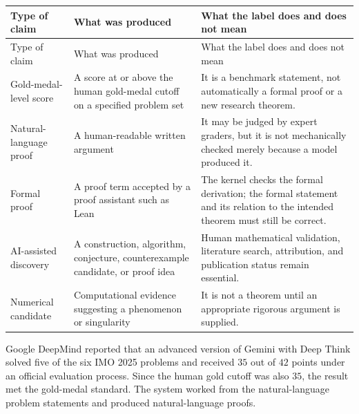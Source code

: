     {\small
    \renewcommand{\arraystretch}{1.2}
    \begin{longtable}{@{}L{0.23\textwidth}L{0.29\textwidth}L{0.40\textwidth}@{}}
        \toprule
        Type of claim & What was produced & What the label does and does not mean \\
        \midrule
        \endfirsthead

        \toprule
        Type of claim & What was produced & What the label does and does not mean \\
        \midrule
        \endhead

        \bottomrule
        \endlastfoot

        Gold-medal-level score
        & A score at or above the human gold-medal cutoff on a specified problem set
        & It is a benchmark statement, not automatically a formal proof or a new
          research theorem. \\

        Natural-language proof
        & A human-readable written argument
        & It may be judged by expert graders, but it is not mechanically checked
          merely because a model produced it. \\

        Formal proof
        & A proof term accepted by a proof assistant such as Lean
        & The kernel checks the formal derivation; the formal statement and its
          relation to the intended theorem must still be correct. \\

        AI-assisted discovery
        & A construction, algorithm, conjecture, counterexample candidate, or proof idea
        & Human mathematical validation, literature search, attribution, and
          publication status remain essential. \\

        Numerical candidate
        & Computational evidence suggesting a phenomenon or singularity
        & It is not a theorem until an appropriate rigorous argument is supplied. \\
    \end{longtable}
    }

    \begin{fact}
        Google DeepMind reported that an advanced version of Gemini with Deep
        Think solved five of the six IMO 2025 problems and received $35$ out of
        $42$ points under an official evaluation process. Since the human gold
        cutoff was also $35$, the result met the gold-medal standard. The system
        worked from the natural-language problem statements and produced
        natural-language proofs.
    \end{fact}

